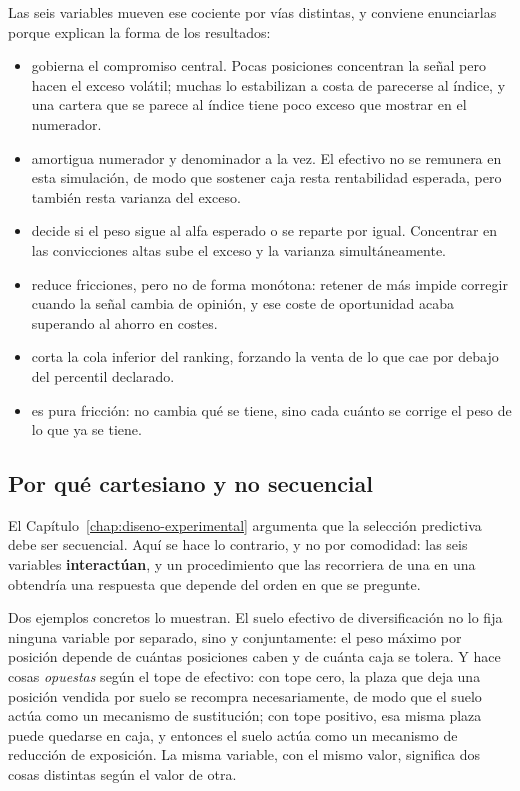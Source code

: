 Las seis variables mueven ese cociente por vías distintas, y conviene enunciarlas porque explican la
forma de los resultados:

\begin{itemize}
  \item {} gobierna el compromiso central. Pocas posiciones concentran la
  señal pero hacen el exceso volátil; muchas lo estabilizan a costa de parecerse al índice, y una
  cartera que se parece al índice tiene poco exceso que mostrar en el numerador.
  \item {} amortigua numerador y denominador a la vez. El efectivo no se
  remunera en esta simulación, de modo que sostener caja resta rentabilidad esperada, pero también
  resta varianza del exceso.
  \item {} decide si el peso sigue al alfa esperado o se reparte por igual.
  Concentrar en las convicciones altas sube el exceso y la varianza simultáneamente.
  \item {} reduce fricciones, pero no de forma monótona: retener
  de más impide corregir cuando la señal cambia de opinión, y ese coste de oportunidad acaba
  superando al ahorro en costes.
  \item {} corta la cola inferior del ranking, forzando la
  venta de lo que cae por debajo del percentil declarado.
  \item {} es pura fricción: no cambia qué se tiene, sino cada
  cuánto se corrige el peso de lo que ya se tiene.
\end{itemize}

\subsection*{Por qué cartesiano y no secuencial}

El Capítulo~\ref{chap:diseno-experimental} argumenta que la selección predictiva debe ser
secuencial. Aquí se hace lo contrario, y no por comodidad: las seis variables \textbf{interactúan},
y un procedimiento que las recorriera de una en una obtendría una respuesta que depende del orden en
que se pregunte.

Dos ejemplos concretos lo muestran. El suelo efectivo de diversificación no lo fija ninguna variable
por separado, sino  y  conjuntamente: el peso
máximo por posición depende de cuántas posiciones caben y de cuánta caja se tolera. Y
 hace cosas \emph{opuestas} según el tope de efectivo: con
tope cero, la plaza que deja una posición vendida por suelo se recompra necesariamente, de modo que
el suelo actúa como un mecanismo de sustitución; con tope positivo, esa misma plaza puede quedarse
en caja, y entonces el suelo actúa como un mecanismo de reducción de exposición. La misma variable,
con el mismo valor, significa dos cosas distintas según el valor de otra.

